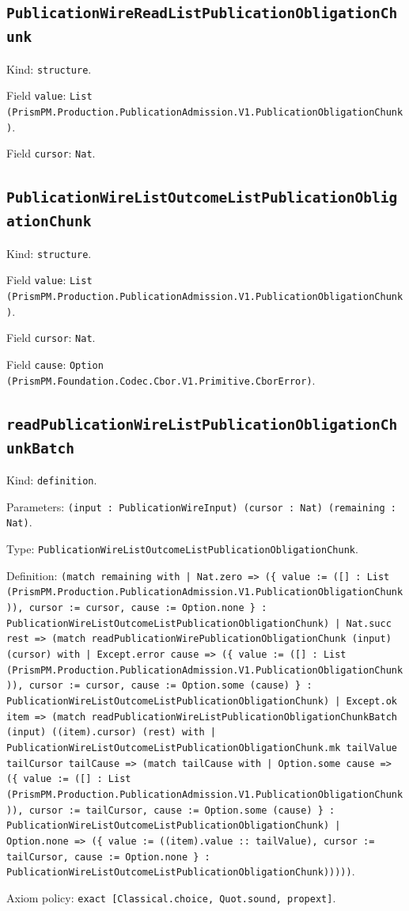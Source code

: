 \documentclass[11pt]{article}
\begin{document}
\subsection*{\texttt{PublicationWireReadListPublicationObligationChunk}}
\noindent Kind: \texttt{structure}.\par
\noindent Field \texttt{value}: \texttt{List (PrismPM.Production.PublicationAdmission.V1.PublicationObligationChunk)}.\par
\noindent Field \texttt{cursor}: \texttt{Nat}.\par
\subsection*{\texttt{PublicationWireListOutcomeListPublicationObligationChunk}}
\noindent Kind: \texttt{structure}.\par
\noindent Field \texttt{value}: \texttt{List (PrismPM.Production.PublicationAdmission.V1.PublicationObligationChunk)}.\par
\noindent Field \texttt{cursor}: \texttt{Nat}.\par
\noindent Field \texttt{cause}: \texttt{Option (PrismPM.Foundation.Codec.Cbor.V1.Primitive.CborError)}.\par
\subsection*{\texttt{readPublicationWireListPublicationObligationChunkBatch}}
\noindent Kind: \texttt{definition}.\par
\noindent Parameters: \texttt{(input : PublicationWireInput) (cursor : Nat) (remaining : Nat)}.\par
\noindent Type: \texttt{PublicationWireListOutcomeListPublicationObligationChunk}.\par
\noindent Definition: \texttt{(match remaining with | Nat.zero => (\{ value := ([] : List (PrismPM.Production.PublicationAdmission.V1.PublicationObligationChunk)), cursor := cursor, cause := Option.none \} : PublicationWireListOutcomeListPublicationObligationChunk) | Nat.succ rest => (match readPublicationWirePublicationObligationChunk (input) (cursor) with | Except.error cause => (\{ value := ([] : List (PrismPM.Production.PublicationAdmission.V1.PublicationObligationChunk)), cursor := cursor, cause := Option.some (cause) \} : PublicationWireListOutcomeListPublicationObligationChunk) | Except.ok item => (match readPublicationWireListPublicationObligationChunkBatch (input) ((item).cursor) (rest) with | PublicationWireListOutcomeListPublicationObligationChunk.mk tailValue tailCursor tailCause => (match tailCause with | Option.some cause => (\{ value := ([] : List (PrismPM.Production.PublicationAdmission.V1.PublicationObligationChunk)), cursor := tailCursor, cause := Option.some (cause) \} : PublicationWireListOutcomeListPublicationObligationChunk) | Option.none => (\{ value := ((item).value :: tailValue), cursor := tailCursor, cause := Option.none \} : PublicationWireListOutcomeListPublicationObligationChunk)))))}.\par
\noindent Axiom policy: \texttt{exact [Classical.choice, Quot.sound, propext]}.\par
\end{document}
